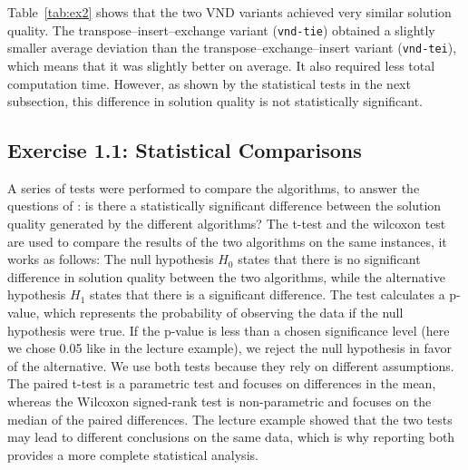 Table~\ref{tab:ex2} shows that the two VND variants achieved very similar solution quality. The transpose--insert--exchange variant (\texttt{vnd-tie}) obtained a slightly smaller average deviation than the transpose--exchange--insert variant (\texttt{vnd-tei}), which means that it was slightly better on average. It also required less total computation time. However, as shown by the statistical tests in the next subsection, this difference in solution quality is not statistically significant.

\subsection{Exercise 1.1: Statistical Comparisons}

A series of tests were performed to compare the algorithms, to answer the questions of : is there a statistically significant difference between the solution quality generated by the different algorithms? The t-test and the wilcoxon test are used to compare the results of the two algorithms on the same instances, it works as follows: The null hypothesis \(H_0\) states that there is no significant difference in solution quality between the two algorithms, while the alternative hypothesis \(H_1\) states that there is a significant difference. The test calculates a p-value, which represents the probability of observing the data if the null hypothesis were true. If the p-value is less than a chosen significance level (here we chose 0.05 like in the lecture example), we reject the null hypothesis in favor of the alternative. We use both tests because they rely on different assumptions. The paired t-test is a parametric test and focuses on differences in the mean, whereas the Wilcoxon signed-rank test is non-parametric and focuses on the median of the paired differences. The lecture example showed that the two tests may lead to different conclusions on the same data, which is why reporting both provides a more complete statistical analysis.

\begin{table}[H]
\centering
\caption{Selected statistical comparisons for Exercise 1.1.}
\label{tab:stats_ex1}
\end{table}

